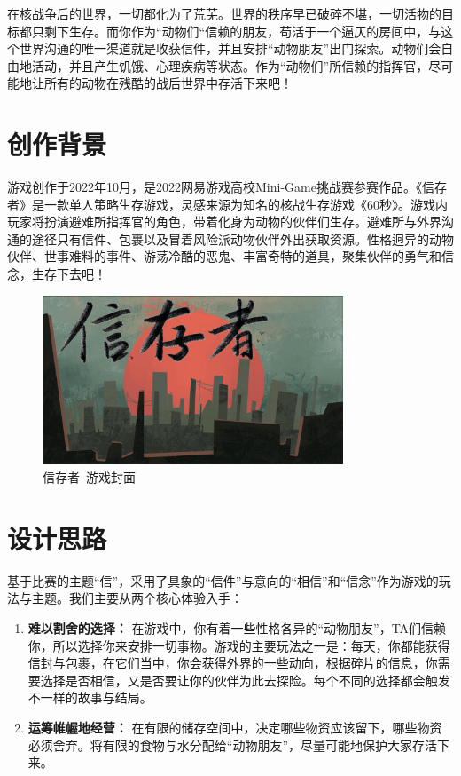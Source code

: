 

在核战争后的世界，一切都化为了荒芜。世界的秩序早已破碎不堪，一切活物的目标都只剩下生存。而你作为“动物们“信赖的朋友，苟活于一个逼仄的房间中，与这个世界沟通的唯一渠道就是收获信件，并且安排“动物朋友”出门探索。动物们会自由地活动，并且产生饥饿、心理疾病等状态。作为“动物们”所信赖的指挥官，尽可能地让所有的动物在残酷的战后世界中存活下来吧！

\section{创作背景}

游戏创作于2022年10月，是2022网易游戏高校Mini-Game挑战赛参赛作品。《信存者》是一款单人策略生存游戏，灵感来源为知名的核战生存游戏《60秒》。游戏内玩家将扮演避难所指挥官的角色，带着化身为动物的伙伴们生存。避难所与外界沟通的途径只有信件、包裹以及冒着风险派动物伙伴外出获取资源。性格迥异的动物伙伴、世事难料的事件、游荡冷酷的恶鬼、丰富奇特的道具，聚集伙伴的勇气和信念，生存下去吧！

\begin{figure}[H]
    \centering
    \includegraphics[width=0.8\textwidth]{Images/信存者/poster.jpg}
    \caption{信存者\ 游戏封面}
\end{figure}

\section{设计思路}
基于比赛的主题“信”，采用了具象的“信件”与意向的“相信”和“信念”作为游戏的玩法与主题。我们主要从两个核心体验入手：

\begin{enumerate}
\item \textbf{难以割舍的选择：} 在游戏中，你有着一些性格各异的“动物朋友”，TA们信赖你，所以选择你来安排一切事物。游戏的主要玩法之一是：每天，你都能获得信封与包裹，在它们当中，你会获得外界的一些动向，根据碎片的信息，你需要选择是否相信，又是否要让你的伙伴为此去探险。每个不同的选择都会触发不一样的故事与结局。

\item \textbf{运筹帷幄地经营：} 在有限的储存空间中，决定哪些物资应该留下，哪些物资必须舍弃。将有限的食物与水分配给“动物朋友”，尽量可能地保护大家存活下来。
\end{enumerate}

